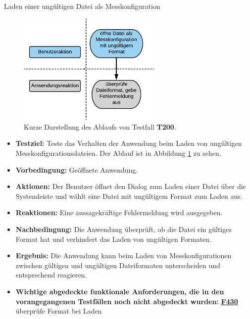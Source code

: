 \documentclass[parskip=full]{scrartcl}
\begin{document}
\begin{description} 

\hypertarget{link-t200}{\item[T200]} Laden einer ungültigen Datei als Messkonfiguration

\begin{figure}[htbp]
	\begin{center}
		\includegraphics[width = 7cm]{Grafik/T200-Ablauf.png}
		\caption{Kurze Darstellung des Ablaufs von Testfall \textbf{T200}.}
		\label{T200-Ablauf}
	\end{center}
\end{figure}
\begin{itemize}

\item []\textbf{Testziel:} Teste das Verhalten der Anwendung beim Laden von ungültigen Messkonfigurationsdateien. Der Ablauf ist in Abbildung \ref{T200-Ablauf} zu sehen.

\item []\textbf{Vorbedingung:} Geöffnete Anwendung.
\item []\textbf{Aktionen:} Der Benutzer öffnet den Dialog zum Laden einer Datei über die Systemleiste und wählt eine Datei mit ungültigem Format zum Laden aus.
\item []\textbf{Reaktionen:} Eine aussagekräftige Fehlermeldung wird ausgegeben.
\item []\textbf{Nachbedingung:} Die Anwendung überprüft, ob die Datei ein gültiges Format hat und verhindert das Laden von ungültigen Formaten. 


\item []\textbf{Ergebnis:} Die Anwendung kann beim Laden von Messkonfigurationen zwischen gültigen und ungültigen Dateiformaten unterscheiden und entsprechend reagieren.
\item []\textbf{Wichtige abgedeckte funktionale Anforderungen, die in den vorangegangenen Testfällen noch nicht abgedeckt wurden:} \hyperlink{link-f430}{\textbf{F430}} überprüfe Format bei Laden


\end{itemize}
\end{description}
\end{document}

